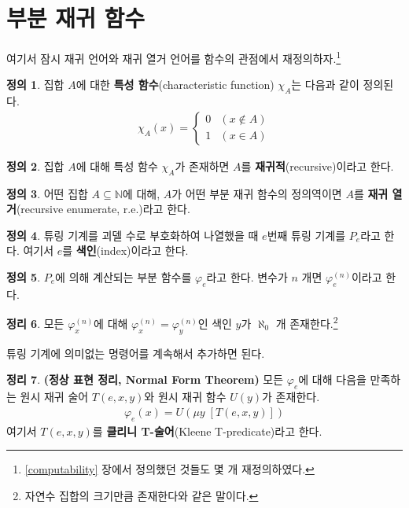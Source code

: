 \documentclass[b5paper, 11pt]{book}
\theoremstyle{definition}
\newtheorem{defn}{정의}[chapter]
\newtheorem{thm}[defn]{정리}
\newenvironment{pf*}{\pushQED{\qed}\pf}
{\popQED\endpf}
\begin{document}
\section{부분 재귀 함수}
여기서 잠시 재귀 언어와 재귀 열거 언어를 함수의 관점에서 재정의하자.\footnote{\ref{computability} 장에서 정의했던 것들도 몇 개 재정의하였다.}
\begin{defn}
집합 $A$에 대한 \textbf{특성 함수}(characteristic function) $\chi_A$는 다음과 같이 정의된다.
    \begin{align*}
        \chi_A(x) = 
        \begin{cases}
            0 & (x \notin A) \\ 
            1 & (x \in A)
        \end{cases}
    \end{align*}
\end{defn}
\begin{defn}
    집합 $A$에 대해 특성 함수 $\chi_A$가 존재하면 $A$를 \textbf{재귀적}(recursive)이라고 한다. 
\end{defn}
\begin{defn}
    어떤 집합 $A \subseteq \mathbb{N}$에 대해, $A$가 어떤 부분 재귀 함수의 정의역이면 $A$를 \textbf{재귀 열거}(recursive enumerate, r.e.)라고 한다.
\end{defn}
\begin{defn}
    튜링 기계를 괴델 수로 부호화하여 나열했을 때 $e$번째 튜링 기계를 $P_e$라고 한다. 여기서 $e$를 \textbf{색인}(index)이라고 한다.
\end{defn}
\begin{defn}
    $P_e$에 의해 계산되는 부분 함수를 $\varphi_e$라고 한다. 변수가 $n$ 개면 $\varphi_e^{(n)}$이라고 한다.
\end{defn}
\begin{thm}
    모든 $\varphi_x^{(n)}$에 대해 $\varphi_x^{(n)} = \varphi_y^{(n)}$인 색인 $y$가 $\aleph_0$ 개 존재한다.\footnote{자연수 집합의 크기만큼 존재한다와 같은 말이다.}
\end{thm}
\begin{pf*}
    튜링 기계에 의미없는 명령어를 계속해서 추가하면 된다.
\end{pf*}
\begin{thm}
    \textbf{(정상 표현 정리, Normal Form Theorem)} 모든 $\varphi_e$에 대해 다음을 만족하는 원시 재귀 술어 $T(e, x, y )$와 원시 재귀 함수 $U(y)$가 존재한다.
    \begin{align*}
        \varphi_e (x) = U (\mu y \; [T(e,x,y)])
    \end{align*}
    여기서 $T(e, x, y)$를 \textbf{클리니 T-술어}(Kleene T-predicate)라고 한다.
\end{thm}
\end{document}
